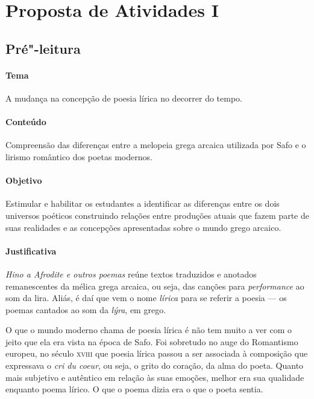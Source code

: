 \documentclass[12pt]{extarticle}
\begin{document}

\section{Proposta de Atividades I}

\subsection{Pré"-leitura}

\paragraph{Tema} A mudança na concepção de poesia lírica no decorrer do tempo.

\paragraph{Conteúdo} Compreensão das diferenças entre a melopeia grega arcaica
utilizada por Safo e o lirismo romântico dos poetas modernos.

\paragraph{Objetivo} Estimular e habilitar os estudantes a identificar as 
diferenças entre os dois universos poéticos construindo relações entre
produções atuais que fazem parte de suas realidades e as concepções 
apresentadas sobre o mundo grego arcaico.

\paragraph{Justificativa} \emph{Hino a Afrodite e outros poemas} reúne textos traduzidos 
e anotados remanescentes da mélica grega arcaica, ou seja, das canções para 
\textit{performance} ao som da lira. Aliás, é daí que vem o nome \emph{lírica} 
para se referir a poesia --- os poemas cantados ao som da \textit{lýra}, em grego.

O que o mundo moderno chama de poesia lírica é não tem muito a ver com
o jeito que ela era vista na época de Safo. Foi sobretudo no auge do
Romantismo europeu, no século \textsc{xviii} que poesia lírica passou a ser
associada à composição que expressava o \textit{cri du coeur}, ou seja,
o grito do coração, da alma do poeta. Quanto mais subjetivo e autêntico
em relação às suas emoções, melhor era sua qualidade enquanto poema
lírico. O que o poema dizia era o que o poeta sentia. 
\end{document}
